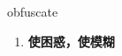 
\begin{frame}
{\huge obfuscate}
\begin{center}
\begin{enumerate}\Large
  \item \textbf{使困惑，使模糊}
\end{enumerate}
\end{center}
\end{frame}
